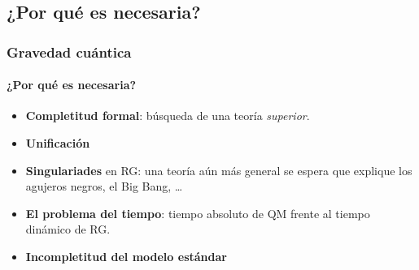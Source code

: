 \documentclass{beamer}
\begin{document}
\subsection{¿Por qué es necesaria?}
\begin{frame}
\frametitle{Gravedad cuántica}
\framesubtitle{¿Por qué es necesaria?}
\begin{block}{}
  \begin{itemize}
    \item \textbf{Completitud formal}: búsqueda de una teoría \emph{superior}.
    \item \textbf{Unificación}
    \item \textbf{Singulariades} en RG: una teoría aún más general se espera que explique los agujeros negros, el Big Bang, \dots
    \item \textbf{El problema del tiempo}: tiempo absoluto de QM frente al tiempo dinámico de RG.
    \item \textbf{Incompletitud del modelo estándar}
  \end{itemize}
\end{block}
\end{frame}

\end{document}
